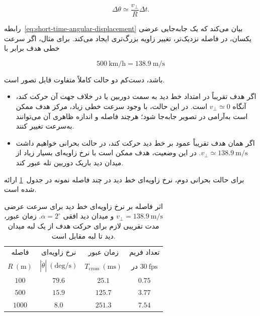 \documentclass[12pt,a4paper]{article}
\begin{document}
\begin{equation}
	\Delta\theta
	\simeq
	\frac{
		v_{\perp}
	}{
		R
	}
	\Delta t.
	\label{eq:short-time-angular-displacement}
\end{equation}

رابطه~\eqref{eq:short-time-angular-displacement} بیان می‌کند که یک
جابه‌جایی عرضی یکسان، در فاصله نزدیک‌تر، تغییر زاویه بزرگ‌تری ایجاد
می‌کند. برای مثال، اگر سرعت خطی هدف برابر با

\begin{equation}
	500~\mathrm{km/h}
	=
	138.9~\mathrm{m/s}
\end{equation}

باشد، دست‌کم دو حالت کاملاً متفاوت قابل تصور است.

\begin{itemize}
	\item
	اگر هدف تقریباً در امتداد خط دید به سمت دوربین یا در خلاف جهت
	آن حرکت کند، آنگاه
	\(v_{\perp}\simeq0\)
	است. در این حالت، با وجود سرعت خطی زیاد، مرکز هدف ممکن است
	به‌آرامی در تصویر جابه‌جا شود؛ هرچند فاصله و اندازه ظاهری آن
	می‌توانند به‌سرعت تغییر کنند.
	
	\item
	اگر همان هدف تقریباً عمود بر خط دید حرکت کند، در حالت بحرانی
	خواهیم داشت
	\(v_{\perp}\simeq138.9~\mathrm{m/s}\).
	در این وضعیت، هدف ممکن است با نرخ زاویه‌ای بسیار زیاد از میدان
	دید باریک دوربین تله عبور کند.
\end{itemize}

برای حالت بحرانی دوم، نرخ زاویه‌ای خط دید در چند فاصله نمونه در
جدول~\ref{tab:los-rate-example} ارائه شده است.

\begin{table}[t]
	\centering
	\caption{
		اثر فاصله بر نرخ زاویه‌ای خط دید برای سرعت عرضی
		\(v_{\perp}=138.9~\mathrm{m/s}\)
		و میدان دید افقی
		\(\alpha=2^{\circ}\).
		زمان عبور، مدت تقریبی لازم برای حرکت هدف از یک لبه میدان دید
		تا لبه مقابل است.
	}
	\label{tab:los-rate-example}
	
	\begin{tabular}{cccc}
		\toprule
		فاصله
		&
		نرخ زاویه‌ای
		&
		زمان عبور
		&
		تعداد فریم
		\\
		\(R~(\mathrm{m})\)
		&
		\(|\dot{\theta}|~(\mathrm{deg/s})\)
		&
		\(T_{\mathrm{cross}}~(\mathrm{ms})\)
		&
		در \(30~\mathrm{fps}\)
		\\
		\midrule
		\(100\)
		&
		\(79.6\)
		&
		\(25.1\)
		&
		\(0.75\)
		\\
		
		\(500\)
		&
		\(15.9\)
		&
		\(125.7\)
		&
		\(3.77\)
		\\
		
		\(1000\)
		&
		\(8.0\)
		&
		\(251.3\)
		&
		\(7.54\)
		\\
		\bottomrule
	\end{tabular}
\end{table}
\end{document}
